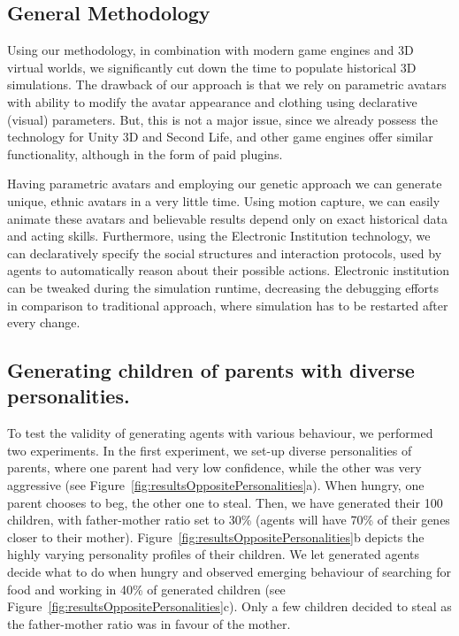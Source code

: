 \subsection{General Methodology}

Using our methodology, in combination with modern game engines and 3D virtual worlds, we significantly cut down the time to populate historical 3D simulations. The drawback of our approach is that we rely on parametric avatars with ability to modify the avatar appearance and clothing using declarative (visual) parameters. But, this is not a major issue, since we already possess the technology for Unity 3D and Second Life, and other game engines offer similar functionality, although in the form of paid plugins. 

Having parametric avatars and employing our genetic approach we can generate unique, ethnic avatars in a very little time. Using motion capture, we can easily animate these avatars and believable results depend only on exact historical data and acting skills. Furthermore, using the Electronic Institution technology, we can declaratively specify the social structures and interaction protocols, used by agents to automatically reason about their possible actions. Electronic institution can be tweaked during the simulation runtime, decreasing the debugging efforts in comparison to traditional approach, where simulation has to be restarted after every change.


\subsection{Generating children of parents with diverse personalities.} 

To test the validity of generating agents with various behaviour, we performed two experiments. In the first experiment, we set-up diverse personalities of parents, where one parent had very low confidence, while the other was very aggressive (see Figure~\ref{fig:resultsOppositePersonalities}a). When hungry, one parent chooses to beg, the other one to steal. Then, we have generated their 100 children, with father-mother ratio set to 30\% (agents will have 70\% of their genes closer to their mother). Figure~\ref{fig:resultsOppositePersonalities}b depicts the highly varying personality profiles of their children. We let generated agents decide what to do when hungry and observed emerging behaviour of searching for food and working in 40\% of generated children (see Figure~\ref{fig:resultsOppositePersonalities}c). Only a few children decided to steal as the father-mother ratio was in favour of the mother.  


